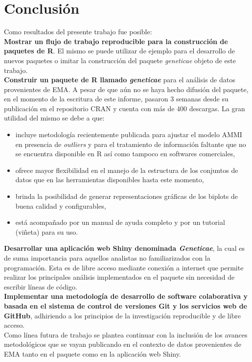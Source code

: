 \chapter{Conclusión}

Como resultados del presente trabajo fue posible:\\

\textbf{Mostrar un flujo de trabajo reproducible para la construcción de paquetes de R}. El mismo se puede utilizar de ejemplo para el desarrollo de nuevos paquetes o imitar la construcción del paquete \emph{geneticae} objeto de este trabajo. \\

\textbf{Construir un paquete de R llamado \emph{geneticae}} para el análisis de datos provenientes de EMA. A pesar de que aún no se haya hecho difusión del paquete, en el momento de la escritura de este informe, pasaron 3 semanas desde su publicación en el repositorio CRAN y cuenta con más de 400 descargas. La gran utilidad del mismo se debe a que:

\begin{itemize}
\item incluye metodología recientemente publicada para ajustar el modelo AMMI en presencia de \emph{outliers} y para el tratamiento de información faltante que no se encuentra disponible en R así como tampoco en softwares comerciales,

\item ofrece mayor flexibilidad en el manejo de la estructura de los conjuntos de datos que en las herramientas disponibles hasta este momento,

\item brinda la posibilidad de generar representaciones gráficas de los biplots de buena calidad y configurables,

\item está acompañado por un manual de ayuda completo y por un tutorial (viñeta) para su uso.
\end{itemize}


\textbf{Desarrollar una aplicación web Shiny denominada \emph{Geneticae}}, la cual es de suma importancia para aquellos analistas no familiarizados con la programación. Esta es de libre acceso mediante conexión a internet que permite realizar los principales análisis implementados en el paquete sin necesidad de escribir líneas de código. \\

\textbf{Implementar una metodología de desarrollo de software colaborativa y basada en el sistema de control de versiones Git y los servicios web de GitHub}, adhiriendo a los principios de la investigación reproducible y de libre acceso.\\

Como línea futura de trabajo se plantea continuar con la inclusión de los avances metodológicos que se vayan publicando en el contexto de datos provenientes de EMA tanto en el paquete como en la aplicación web Shiny. 




